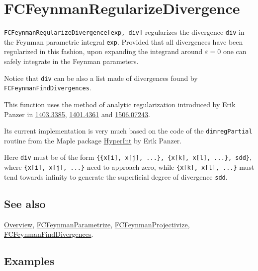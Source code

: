 \documentclass[../FeynCalcManual.tex]{subfiles}
\begin{document}
\hypertarget{fcfeynmanregularizedivergence}{
\section{FCFeynmanRegularizeDivergence}\label{fcfeynmanregularizedivergence}}

\texttt{FCFeynmanRegularizeDivergence[\allowbreak{}exp,\ \allowbreak{}div]}
regularizes the divergence \texttt{div} in the Feynman parametric
integral \texttt{exp}. Provided that all divergences have been
regularized in this fashion, upon expanding the integrand around
\(\varepsilon = 0\) one can safely integrate in the Feynman parameters.

Notice that \texttt{div} can be also a list made of divergences found by
\texttt{FCFeynmanFindDivergences}.

This function uses the method of analytic regularization introduced by
Erik Panzer in \href{https://arxiv.org/abs/1403.3385}{1403.3385},
\href{https://arxiv.org/abs/1401.4361}{1401.4361} and
\href{https://arxiv.org/abs/1506.07243}{1506.07243}.

Its current implementation is very much based on the code of the
\texttt{dimregPartial} routine from the Maple package
\href{https://bitbucket.org/PanzerErik/hyperint/}{HyperInt} by Erik
Panzer.

Here \texttt{div} must be of the form
\texttt{\{\allowbreak{}\{\allowbreak{}x[\allowbreak{}i],\ \allowbreak{}x[\allowbreak{}j],\ \allowbreak{}...\},\ \allowbreak{}\{\allowbreak{}x[\allowbreak{}k],\ \allowbreak{}x[\allowbreak{}l],\ \allowbreak{}...\},\ \allowbreak{}sdd\}},
where
\texttt{\{\allowbreak{}x[\allowbreak{}i],\ \allowbreak{}x[\allowbreak{}j],\ \allowbreak{}...\}}
need to approach zero, while
\texttt{\{\allowbreak{}x[\allowbreak{}k],\ \allowbreak{}x[\allowbreak{}l],\ \allowbreak{}...\}}
must tend towards infinity to generate the superficial degree of
divergence \texttt{sdd}.

\subsection{See also}

\hyperlink{toc}{Overview},
\hyperlink{fcfeynmanparametrize}{FCFeynmanParametrize},
\hyperlink{fcfeynmanprojectivize}{FCFeynmanProjectivize},
\hyperlink{fcfeynmanfinddivergences}{FCFeynmanFindDivergences}.

\subsection{Examples}
\end{document}
